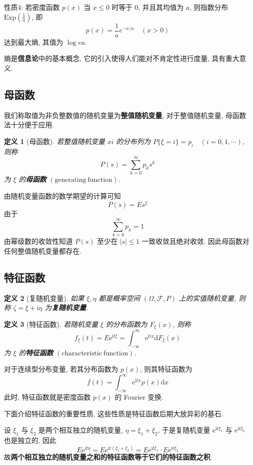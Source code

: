 \documentclass[12pt,a4paper]{article}
\newtheorem{definition}{定义}[subsection] %
\begin{document}
性质4: 若密度函数 $p(x)$ 当 $x \leq 0$ 时等于 $0$, 并且其均值为 $a$, 则指数分布 $\mathrm{Exp}(\frac{1}{a})$, 即 \[p(x) = \frac{1}{a} e^{-x/a} \quad (x>0)\]
达到最大熵, 其值为 $\log ea$.

熵是\textbf{信息论}中的基本概念, 它的引入使得人们能对不肯定性进行度量, 具有重大意义.

\subsection{母函数}
我们称取值为非负整数值的随机变量为\textbf{整值随机变量}, 对于整值随机变量, 母函数法十分便于应用.
\begin{definition}[母函数]
    若整值随机变量 $xi$ 的分布列为 $P\{\xi = i\} = p_i \quad (i=0,1,\cdots)$, 则称
    \[P(s) = \sum\limits_{k=0}^{\infty} p_k s^k\] 为 $\xi$ 的\textbf{母函数} $(\mathrm{generating \ function})$. 
\end{definition}
由随机变量函数的数学期望的计算可知 \[P(s) = E s^{\xi}\]
由于\[\sum\limits_{k=0}^{\infty} p_k = 1\] 由幂级数的收敛性知道 $P(s)$ 至少在 $|s| \leq 1$ 一致收敛且绝对收敛.
因此母函数对任何整值随机变量都存在.

\subsection{特征函数}

\begin{definition}[复随机变量]
    如果 $\xi, \eta$ 都是概率空间 $(\Omega, \mathscr{F}, P)$ 上的实值随机变量, 则称 $\zeta = \xi + \mathrm{i} \eta$ 为\textbf{复随机变量}.
\end{definition}

\begin{definition}[特征函数]
    若随机变量 $\xi$ 的分布函数为 $F_{\xi}(x)$, 则称 \[f_{\xi}(t) = E \mathrm{e}^{\mathrm{i} t \xi} = \int_{-\infty}^{\infty} \mathrm{e}^{\mathrm{i} t x} \mathrm{d} F_{\xi}(x)\] 为 $\xi$ 的\textbf{特征函数} $(\mathrm{characteristic \ function})$.
\end{definition}

对于连续型分布变量, 若其分布函数为 $p(x)$, 则其特征函数为 \[f(t) = \int_{-\infty}^{\infty} \mathrm{e}^{\mathrm{i}tx} p(x) \mathrm{d}x\]
此时, 特征函数就是密度函数 $p(x)$ 的 Fourier 变换.

下面介绍特征函数的重要性质, 这些性质是特征函数后期大放异彩的基石.

设 $\xi_1$ 与 $\xi_2$ 是两个相互独立的随机变量, $\eta = \xi_1 + \xi_2$, 于是复随机变量 $\mathrm{e}^{\mathrm{i}t\xi_1}$ 与 $\mathrm{e}^{\mathrm{i}t\xi_2}$ 也是独立的, 因此
\[E \mathrm{e}^{\mathrm{i}t\eta} = E \mathrm{e}^{\mathrm{i}t(\xi_1 + \xi_2)} = E \mathrm{e}^{\mathrm{i}t\xi_1} \cdot E \mathrm{e}^{\mathrm{i}t\xi_2}\]
故\textbf{两个相互独立的随机变量之和的特征函数等于它们的特征函数之积}.  
\end{document}
